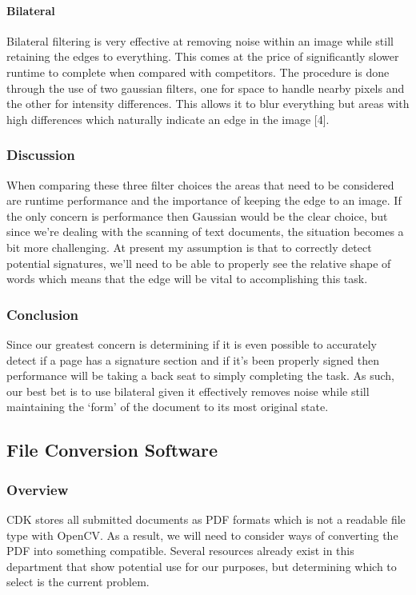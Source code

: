 \documentclass[article, onecolumn, draftclsnofoot,10pt, compsoc]{IEEEtran}
\begin{document}
\paragraph{Bilateral}
Bilateral filtering is very effective at removing noise within an image while still retaining the edges to everything. This comes at the price of significantly slower runtime to complete when compared with competitors. The procedure is done through the use of two gaussian filters, one for space to handle nearby pixels and the other for intensity differences. This allows it to blur everything but areas with high differences which naturally indicate an edge in the image [4]. 

\subsubsection{Discussion}
When comparing these three filter choices the areas that need to be considered are runtime performance and the importance of keeping the edge to an image. If the only concern is performance then Gaussian would be the clear choice, but since we’re dealing with the scanning of text documents, the situation becomes a bit more challenging. At present my assumption is that to correctly detect potential signatures, we’ll need to be able to properly see the relative shape of words which means that the edge will be vital to accomplishing this task. 

\subsubsection{Conclusion}
Since our greatest concern is determining if it is even possible to accurately detect if a page has a signature section and if it’s been properly signed then performance will be taking a back seat to simply completing the task. As such, our best bet is to use bilateral given it effectively removes noise while still maintaining the ‘form’ of the document to its most original state.

\subsection{File Conversion Software}
\subsubsection{Overview}
CDK stores all submitted documents as PDF formats which is not a readable file type with OpenCV. As a result, we will need to consider ways of converting the PDF into something compatible. Several resources already exist in this department that show potential use for our purposes, but determining which to select is the current problem.
\end{document}
